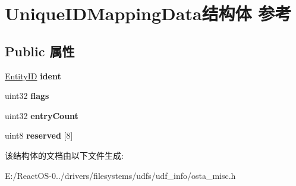 \hypertarget{struct_unique_i_d_mapping_data}{}\section{Unique\+I\+D\+Mapping\+Data结构体 参考}
\label{struct_unique_i_d_mapping_data}
\subsection*{Public 属性}
\begin{DoxyCompactItemize}
\item 
\mbox{\label{struct_unique_i_d_mapping_data_a84c5fcf09dba6882db055e4b47143eb6}} 
\hyperlink{struct_entity_i_d}{Entity\+ID} {\bfseries ident}
\item 
\mbox{\label{struct_unique_i_d_mapping_data_aa833518702c463e9ac71b450d418591f}} 
uint32 {\bfseries flags}
\item 
\mbox{\label{struct_unique_i_d_mapping_data_add793fd691068cae61bfedae9b9edb50}} 
uint32 {\bfseries entry\+Count}
\item 
\mbox{\label{struct_unique_i_d_mapping_data_a5f39c226145034f150807864682ae0f6}} 
uint8 {\bfseries reserved} \mbox{[}8\mbox{]}
\end{DoxyCompactItemize}


该结构体的文档由以下文件生成\+:\begin{DoxyCompactItemize}
\item 
E\+:/\+React\+O\+S-\/0../drivers/filesystems/udfs/udf\+\_\+info/osta\+\_\+misc.\+h\end{DoxyCompactItemize}
